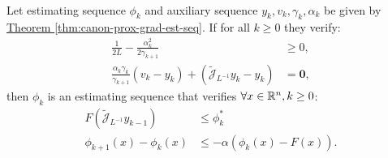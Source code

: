 \documentclass[12pt]{article}
\begin{document}
    \begin{theorem}\;\\
        Let estimating sequence $\phi_k$ and auxiliary sequence $y_k, v_k,\gamma_k, \alpha_k$  be given by 
        \hyperref[thm:canon-prox-grad-est-seq]{Theorem \ref*{thm:canon-prox-grad-est-seq}}. 
        If for all $k\ge 0$ they verify: 
        \begin{align*}
            \frac{1}{2L} - \frac{\alpha_k^2}{2 \gamma_{k + 1}} &\ge 0, 
            \\
            \frac{\alpha_k \gamma_k }{\gamma_{k + 1}} 
            (v_k - y_k) + (\widetilde {\mathcal J}_{L^{-1}} y_k - y_k) &= \mathbf 0, 
        \end{align*}
        then $\phi_{k}$ is an estimating sequence that verifies $\forall x \in \mathbb R^n, k \ge 0$: 
        \begin{align*}
            F\left(
                \widetilde{\mathcal J}_{L^{-1}} y_{k - 1}
            \right) 
            &\le \phi_k^*
            \\
            \phi_{k + 1}(x) - \phi_k(x) &\le -\alpha(\phi_k(x) - F(x)). 
        \end{align*}
    \end{theorem}
\end{document}
